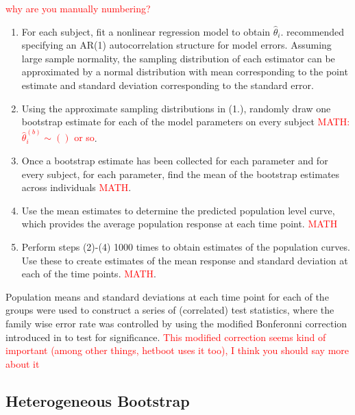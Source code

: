 \documentclass{article}
\providecommand{\pb}[1]{\textcolor{red}{#1}}
\begin{document}
\pb{why are you manually numbering?}
\begin{enumerate}
\vspace{-3mm}
\item For each subject, fit a nonlinear regression model to obtain $\hat{\theta}_i$. \cite{oleson2017detecting} recommended specifying an AR(1) autocorrelation structure for model errors. Assuming large sample normality, the sampling distribution of each estimator can be approximated by a normal distribution with mean corresponding to the point estimate and standard deviation corresponding to the standard error.

\item Using the approximate sampling distributions in (1.), randomly draw one bootstrap estimate for each of the model parameters on every subject \pb{MATH: $\hat{\theta}_i^{(b)} \sim ()$ or so}.

\item Once a bootstrap estimate has been collected for each parameter and for every subject, for each parameter, find the mean of the bootstrap estimates across individuals  \pb{MATH}.

\item Use the mean estimates to determine the predicted population level curve, which provides the average population response at each time point.   \pb{MATH}

\item Perform steps (2)-(4) 1000 times to obtain estimates of the population curves. Use these to create estimates of the mean response and standard deviation at each of the time points.  \pb{MATH}.
\end{enumerate}

Population means and standard deviations at each time point for each of the groups were used to construct a series of (correlated) test statistics, where the family wise error rate was controlled by using the modified Bonferonni correction introduced in \cite{oleson2017detecting} to test for significance. \pb{This modified correction seems kind of important (among other things, hetboot uses it too), I think you should say more about it}

\subsection{Heterogeneous Bootstrap}
\end{document}
